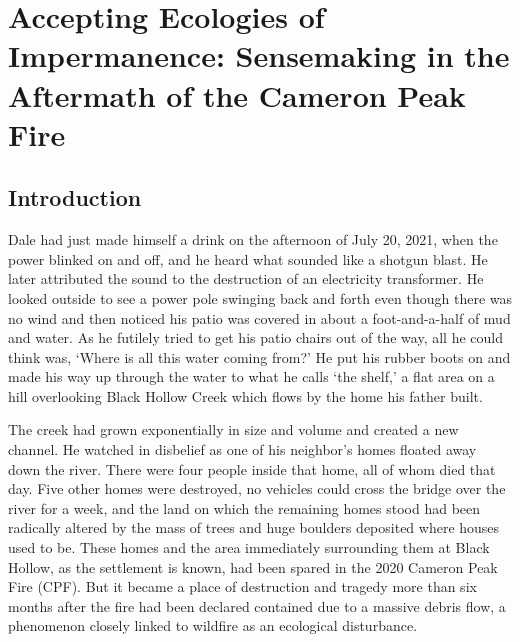 \documentclass[
]{article}
\begin{document}
\clearpage

\section{Accepting Ecologies of Impermanence: Sensemaking in the Aftermath of the Cameron Peak Fire}\label{accepting-ecologies-of-impermanence-sensemaking-in-the-aftermath-of-the-cameron-peak-fire}

\renewcommand{\thefigure}{4.\arabic{figure}}
\setcounter{figure}{0}
\renewcommand{\thetable}{4.\arabic{table}}
\setcounter{table}{0}
\renewcommand{\theequation}{4.\arabic{equation}}
\setcounter{equation}{0}

\subsection{Introduction}\label{introduction-3}

Dale had just made himself a drink on the afternoon of July 20, 2021, when the power blinked on and off, and he heard what sounded like a shotgun blast. He later attributed the sound to the destruction of an electricity transformer. He looked outside to see a power pole swinging back and forth even though there was no wind and then noticed his patio was covered in about a foot-and-a-half of mud and water. As he futilely tried to get his patio chairs out of the way, all he could think was, `Where is all this water coming from?' He put his rubber boots on and made his way up through the water to what he calls `the shelf,' a flat area on a hill overlooking Black Hollow Creek which flows by the home his father built.

The creek had grown exponentially in size and volume and created a new channel. He watched in disbelief as one of his neighbor's homes floated away down the river. There were four people inside that home, all of whom died that day. Five other homes were destroyed, no vehicles could cross the bridge over the river for a week, and the land on which the remaining homes stood had been radically altered by the mass of trees and huge boulders deposited where houses used to be. These homes and the area immediately surrounding them at Black Hollow, as the settlement is known, had been spared in the 2020 Cameron Peak Fire (CPF). But it became a place of destruction and tragedy more than six months after the fire had been declared contained due to a massive debris flow, a phenomenon closely linked to wildfire as an ecological disturbance.
\end{document}
